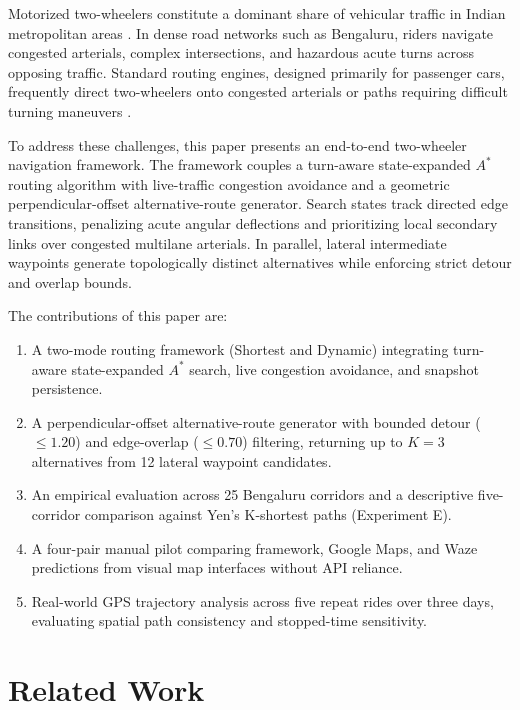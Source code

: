 \documentclass[11pt,conference]{IEEEtran}
\begin{document}
Motorized two-wheelers constitute a dominant share of vehicular traffic in Indian metropolitan areas \cite{kotagi2020modeling,das2019modeling}.
In dense road networks such as Bengaluru, riders navigate congested arterials, complex intersections, and hazardous acute turns across opposing traffic.
Standard routing engines, designed primarily for passenger cars, frequently direct two-wheelers onto congested arterials or paths requiring difficult turning maneuvers \cite{kumar2025realtime,luxen2011realtime}.

To address these challenges, this paper presents an end-to-end two-wheeler navigation framework.
The framework couples a turn-aware state-expanded $A^*$ routing algorithm with live-traffic congestion avoidance and a geometric perpendicular-offset alternative-route generator.
Search states track directed edge transitions, penalizing acute angular deflections and prioritizing local secondary links over congested multilane arterials.
In parallel, lateral intermediate waypoints generate topologically distinct alternatives while enforcing strict detour and overlap bounds.

The contributions of this paper are:
\begin{enumerate}
\item A two-mode routing framework (Shortest and Dynamic) integrating turn-aware state-expanded $A^*$ search, live congestion avoidance, and snapshot persistence.
\item A perpendicular-offset alternative-route generator with bounded detour ($\le 1.20$) and edge-overlap ($\le 0.70$) filtering, returning up to $K=3$ alternatives from 12 lateral waypoint candidates.
\item An empirical evaluation across 25 Bengaluru corridors and a descriptive five-corridor comparison against Yen's K-shortest paths (Experiment E).
\item A four-pair manual pilot comparing framework, Google Maps, and Waze predictions from visual map interfaces without API reliance.
\item Real-world GPS trajectory analysis across five repeat rides over three days, evaluating spatial path consistency and stopped-time sensitivity.
\end{enumerate}


\section{Related Work}
\end{document}
